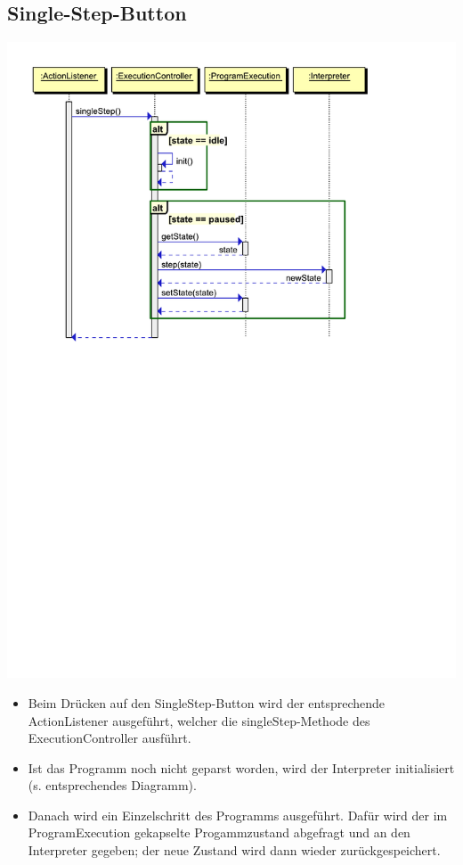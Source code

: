 \documentclass[10pt,a4paper,titlepage]{article}
\begin{document}
\subsection{Single-Step-Button}
\includegraphics[scale=0.9]{images/Button_Singlestep.pdf} \newline
\begin{itemize}
\item Beim Drücken auf den SingleStep-Button wird der entsprechende ActionListener ausgeführt, welcher die singleStep-Methode des ExecutionController ausführt.
\item Ist das Programm noch nicht geparst worden, wird der Interpreter initialisiert (s. entsprechendes Diagramm).
\item Danach wird ein Einzelschritt des Programms ausgeführt. Dafür wird der im ProgramExecution gekapselte Progammzustand abgefragt und an den Interpreter gegeben; der neue Zustand wird dann wieder zurückgespeichert.
\end{itemize}
\end{document}

